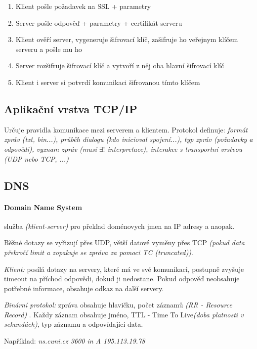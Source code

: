 \documentclass[10pt,a4paper]{article}
\begin{document}
\begin{enumerate}
    \item Klient pošle požadavek na SSL + parametry
    \item Server pošle odpověď + parametry + certifikát serveru
    \item Klient ověří server, vygeneruje šifrovací klíč, zašifruje ho veřejnym klíčem serveru a pošle mu ho
    \item Server rozšifruje šifrovací klíč  a vytvoří z něj oba hlavní šifrovací klíč
    \item Klient i server si potvrdí komunikaci šifrovanou tímto klíčem
\end{enumerate}


\subsection{Aplikační vrstva TCP/IP}

Určuje pravidla komunikace mezi serverem a klientem. Protokol definuje: \textit{formát zpráv (txt, bin...), průběh dialogu (kdo inicioval spojení...), typ zpráv (požadavky a odpovědi), vyznam zpráv (musí $\exists !$ interpretace), interakce s transportní vrstvou (UDP nebo TCP, ...)}

\subsection{DNS}

\paragraph{Domain Name System} služba \textit{(klient-server)} pro překlad doménovych jmen na IP adresy a naopak.

Běžné dotazy se vyřizují přes UDP, větší datové vyměny přes TCP \textit{(pokud data překročí limit a zopakuje se zpráva za pomoci TC (truncated))}.

\textit{Klient:} posílá dotazy na servery, které má ve své komunikaci, postupně zvyšuje timeout na příchod odpovědi, dokud ji nedostane. Pokud odpověď neobsahuje potřebné informace, obsahuje odkaz na další servery.

\textit{Binární protokol:} zpráva obsahuje hlavičku, počet záznamů \textit{(RR - Resource Record)} . Každy záznam obsahuje jméno, TTL - Time To Live\textit{(doba platnosti v sekundách)}, typ záznamu a odpovídající data.

Například: \textit{ns.cuni.cz 3600 in A 195.113.19.78}
\end{document}
